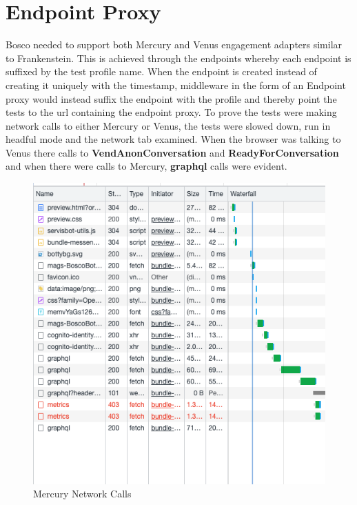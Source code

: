 \documentclass[12pt,a4paper,titlepage]{report}
\begin{document}
\section{Endpoint Proxy}

Bosco needed to support both Mercury and Venus engagement adapters similar to Frankenstein. This is achieved through the endpoints whereby 
each endpoint is suffixed by the test profile name. When the endpoint is created instead of creating it uniquely with the timestamp, middleware 
in the form of an Endpoint proxy would instead suffix the endpoint with the profile and thereby point the tests to the url 
containing the endpoint proxy. To prove the tests were making network calls to either Mercury or Venus, the tests were slowed down, run in headful mode and 
the network tab examined. When the browser was talking to Venus there calls to \textbf{VendAnonConversation} and \textbf{ReadyForConversation} and when there were calls to Mercury, \textbf{graphql} calls were evident.

\begin{figure}[H]
 \centering
 \includegraphics[width=15cm]{./diagrams/mercury_network_calls.png}
 \caption{Mercury Network Calls}
\end{figure}
\end{document}
